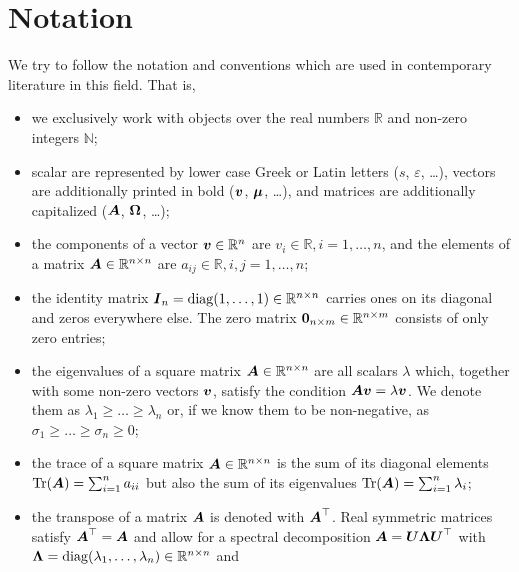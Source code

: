 \chapter*{Notation}
\label{chp:0-notation}

We try to follow the notation and conventions which are used in contemporary
literature in this field. That is,

\begin{itemize}
    \item we exclusively work with objects over the real numbers $\mathbb{R}$ and non-zero integers $\mathbb{N}$;
    \item scalar are represented by lower case Greek or Latin letters ($s$, $\varepsilon$, \dots),
          vectors are additionally printed in bold ($\boldsymbol{v}$, $\boldsymbol{\mu}$, \dots),
          and matrices are additionally capitalized ($\boldsymbol{A}$, $\boldsymbol{\Omega}$, \dots);
    \item the components of a vector $\boldsymbol{v} \in \mathbb{R}^{n}$ are $v_i \in \mathbb{R}, i = 1, \dots, n$,
          and the elements of a matrix $\boldsymbol{A} \in \mathbb{R}^{n \times n}$ are $a_{ij} \in \mathbb{R}, i, j = 1, \dots, n$;
    \item the identity matrix $\boldsymbol{I}_n = \operatorname{diag}(1, \dots, 1) \in \mathbb{R}^{n \times n}$
          carries ones on its diagonal and zeros everywhere else. The zero matrix
          $\boldsymbol{0}_{n \times m} \in \mathbb{R}^{n \times m}$ consists of only zero entries;
    \item the eigenvalues of a square matrix $\boldsymbol{A} \in \mathbb{R}^{n \times n}$
          are all scalars $\lambda$ which, together with some non-zero vectors
          $\boldsymbol{v}$, satisfy the condition $\boldsymbol{A} \boldsymbol{v} = \lambda \boldsymbol{v}$.
          We denote them as $\lambda_1 \geq \dots \geq \lambda_n$ or, if we know
          them to be non-negative, as $\sigma_1 \geq \dots \geq \sigma_n \geq 0$;
    \item the trace of a square matrix $\boldsymbol{A} \in \mathbb{R}^{n \times n}$ is
          the sum of its diagonal elements $\operatorname{Tr}(\boldsymbol{A}) = \sum_{i=1}^n a_{ii}$
          but also the sum of its eigenvalues $\operatorname{Tr}(\boldsymbol{A}) = \sum_{i=1}^n \lambda_i$;
    \item the transpose of a matrix $\boldsymbol{A}$ is denoted with $\boldsymbol{A}^{\top}$.
          Real symmetric matrices satisfy $\boldsymbol{A}^{\top} = \boldsymbol{A}$ and
          allow for a spectral decomposition $\boldsymbol{A} = \boldsymbol{U} \boldsymbol{\Lambda} \boldsymbol{U}^{\top}$
          with $\boldsymbol{\Lambda} = \operatorname{diag}(\lambda_1, \dots, \lambda_n) \in \mathbb{R}^{n \times n}$ and 

\end{itemize}
